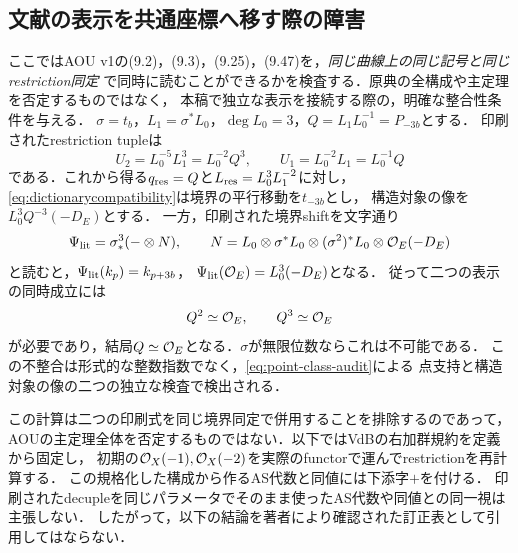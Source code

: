 \subsection{文献の表示を共通座標へ移す際の障害}\label{subsec:boundaryaudit}
ここではAOU v1の(9.2)，(9.3)，(9.25)，(9.47)を，\emph{同じ曲線上の同じ記号と同じrestriction同定}
で同時に読むことができるかを検査する．原典の全構成や主定理を否定するものではなく，
本稿で独立な表示を接続する際の，明確な整合性条件を与える．
$\sigma=t_b$，$L_1=\sigma^*L_0$，$\deg L_0=3$，$Q=L_1L_0^{-1}=P_{-3b}$とする．
印刷されたrestriction tupleは
\begin{equation}\label{eq:printedtuple}
 U_2=L_0^{-5}L_1^3=L_0^{-2}Q^3,\qquad
 U_1=L_0^{-2}L_1=L_0^{-1}Q
\end{equation}
である．これから得る$q_{\rm res}=Q$と$L_{\rm res}=L_0^3L_1^{-2}$に対し，
\eqref{eq:dictionarycompatibility}は境界の平行移動を$t_{-3b}$とし，
構造対象の像を$L_0^3Q^{-3}(-D_E)$とする．
一方，印刷された境界shiftを文字通り
\begin{equation}\label{eq:printedshift}
 \Psi_{\rm lit}=\sigma_*^3(-\otimes N),\qquad
 N=L_0\otimes\sigma^*L_0\otimes(\sigma^2)^*L_0\otimes\mathcal O_E(-D_E)
\end{equation}
と読むと，$\Psi_{\rm lit}(k_p)=k_{p+3b}$，
$\Psi_{\rm lit}(\mathcal O_E)=L_0^3(-D_E)$となる．
従って二つの表示の同時成立には
\begin{equation}\label{eq:normalization-obstruction}
 Q^2\simeq\mathcal O_E,\qquad Q^3\simeq\mathcal O_E
\end{equation}
が必要であり，結局$Q\simeq\mathcal O_E$となる．$\sigma$が無限位数ならこれは不可能である．
この不整合は形式的な整数指数でなく，\eqref{eq:point-class-audit}による
点支持と構造対象の像の二つの独立な検査で検出される．

\begin{remark}[比較する規約を固定する]
この計算は二つの印刷式を同じ境界同定で併用することを排除するのであって，
AOUの主定理全体を否定するものではない．以下ではVdBの右加群規約を定義から固定し，
初期の$\mathcal O_X(-1),\mathcal O_X(-2)$を実際のfunctorで運んでrestrictionを再計算する．
この規格化した構成から作るAS代数と同値には下添字$+$を付ける．
印刷されたdecupleを同じパラメータでそのまま使ったAS代数や同値との同一視は主張しない．
したがって，以下の結論を著者により確認された訂正表として引用してはならない．
\end{remark}

